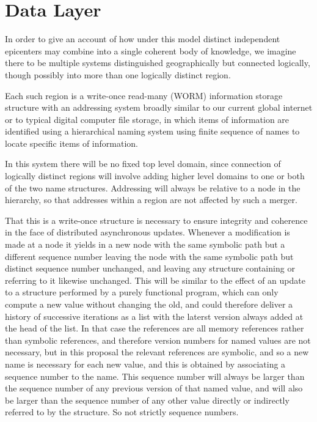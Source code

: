 \documentclass[10pt,titlepage]{article}
\begin{document}
\section{Data Layer}

In order to give an account of how under this model distinct independent epicenters may combine into a single coherent body of knowledge, we imagine there to be multiple systems distinguished geographically but connected logically, though possibly into more than one logically distinct region.

Each such region is a write-once read-many (WORM) information storage structure with an addressing system broadly similar to our current global internet or to typical digital computer file storage, in which items of information are identified using a hierarchical naming system using finite sequence of names to locate specific items of information.

In this system there will be no fixed top level domain, since connection of logically distinct regions will involve adding higher level domains to one or both of the two name structures.
Addressing will always be relative to a node in the hierarchy, so that addresses within a region are not affected by such a merger.

That this is a write-once structure is necessary to ensure integrity and coherence in the face of distributed asynchronous updates.
Whenever a modification is made at a node it yields in a new node with the same symbolic path but a different sequence number leaving the node with the same symbolic path but distinct sequence number unchanged, and leaving any structure containing or referring to it likewise unchanged.
This will be similar to the effect of an update to a structure performed by a purely functional program, which can only compute a new value without changing the old, and could therefore deliver a history of successive iterations as a list with the laterst version always added at the head of the list.
In that case the references are all memory references rather than symbolic references, and therefore version numbers for named values are not necessary, but in this proposal the relevant references are symbolic, and so a new name is necessary for each new value, and this is obtained by associating a sequence number to the name.
This sequence number will always be larger than the sequence number of any previous version of that named value, and will also be larger than the sequence number of any other value directly or indirectly referred to by the structure.
So not strictly sequence numbers.
\end{document}
